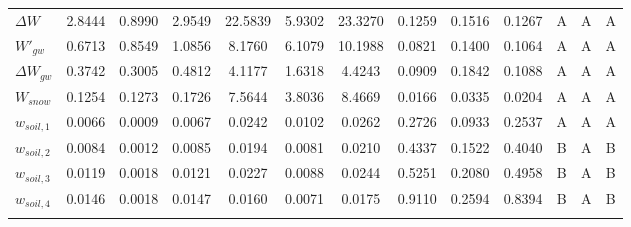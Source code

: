 \begin{tabular}{lcccccccccccc}
    \(\Delta W\)      & \num{2.8444}          & \num{0.8990}          & \num{2.9549}           & \num{22.5839}     & \num{5.9302}      & \num{23.3270}     & \num{0.1259} & \num{0.1516} & \num{0.1267}  & A    & A    & A     \\
    \(W'_{gw}\)       & \num{0.6713}          & \num{0.8549}          & \num{1.0856}           & \num{8.1760}      & \num{6.1079}      & \num{10.1988}     & \num{0.0821} & \num{0.1400} & \num{0.1064}  & A    & A    & A     \\
    \(\Delta W_{gw}\) & \num{0.3742}          & \num{0.3005}          & \num{0.4812}           & \num{4.1177}      & \num{1.6318}      & \num{4.4243}      & \num{0.0909} & \num{0.1842} & \num{0.1088}  & A    & A    & A     \\
    \(W_{snow}\)      & \num{0.1254}          & \num{0.1273}          & \num{0.1726}           & \num{7.5644}      & \num{3.8036}      & \num{8.4669}      & \num{0.0166} & \num{0.0335} & \num{0.0204}  & A    & A    & A     \\
    \(w_{soil,1}\)    & \num{0.0066}          & \num{0.0009}          & \num{0.0067}           & \num{0.0242}      & \num{0.0102}      & \num{0.0262}      & \num{0.2726} & \num{0.0933} & \num{0.2537}  & A    & A    & A     \\
    \(w_{soil,2}\)    & \num{0.0084}          & \num{0.0012}          & \num{0.0085}           & \num{0.0194}      & \num{0.0081}      & \num{0.0210}      & \num{0.4337} & \num{0.1522} & \num{0.4040}  & B    & A    & B     \\
    \(w_{soil,3}\)    & \num{0.0119}          & \num{0.0018}          & \num{0.0121}           & \num{0.0227}      & \num{0.0088}      & \num{0.0244}      & \num{0.5251} & \num{0.2080} & \num{0.4958}  & B    & A    & B     \\
    \(w_{soil,4}\)    & \num{0.0146}          & \num{0.0018}          & \num{0.0147}           & \num{0.0160}      & \num{0.0071}      & \num{0.0175}      & \num{0.9110} & \num{0.2594} & \num{0.8394}  & B    & A    & B     \\
    \bottomhline
\end{tabular}
